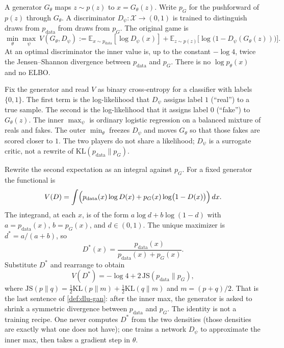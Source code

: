 \begin{definition}
\label{def:dlu-gan}
A generator \(G_\theta\) maps \(z\sim p(z)\) to \(x=G_\theta(z)\). Write \(p_G\) for the pushforward of \(p(z)\) through \(G_\theta\). A discriminator \(D_\psi:\mathcal{X}\to(0,1)\) is trained to distinguish draws from \(p_{\mathrm{data}}\) from draws from \(p_G\). The original game is
\[
\min_\theta\max_\psi\
V(G_\theta,D_\psi)
:=
\mathbb{E}_{x\sim p_{\mathrm{data}}}[\log D_\psi(x)]
+
\mathbb{E}_{z\sim p(z)}\bigl[\log\bigl(1-D_\psi(G_\theta(z))\bigr)\bigr].
\]
At an optimal discriminator the inner value is, up to the constant \(-\log 4\), twice the Jensen--Shannon divergence between \(p_{\mathrm{data}}\) and \(p_G\). There is no \(\log p_\theta(x)\) and no ELBO.
\end{definition}

\begin{note}
\label{note:dlu-gan-read}
Fix the generator and read \(V\) as binary cross-entropy for a classifier with labels \(\{0,1\}\). The first term is the log-likelihood that \(D_\psi\) assigns label \(1\) (``real'') to a true sample. The second is the log-likelihood that it assigns label \(0\) (``fake'') to \(G_\theta(z)\). The inner \(\max_\psi\) is ordinary logistic regression on a balanced mixture of reals and fakes. The outer \(\min_\theta\) freezes \(D_\psi\) and moves \(G_\theta\) so that those fakes are scored closer to \(1\). The two players do not share a likelihood; \(D_\psi\) is a surrogate critic, not a rewrite of \(\mathrm{KL}(p_{\mathrm{data}}\|p_G)\).
\end{note}

\begin{note}
\label{note:dlu-gan-js}
Rewrite the second expectation as an integral against \(p_G\). For a fixed generator the functional is
\[
V(D)
=
\int\Bigl(p_{\mathrm{data}}(x)\log D(x)+p_G(x)\log\bigl(1-D(x)\bigr)\Bigr)\,dx.
\]
The integrand, at each \(x\), is of the form \(a\log d+b\log(1-d)\) with \(a=p_{\mathrm{data}}(x)\), \(b=p_G(x)\), and \(d\in(0,1)\). The unique maximizer is \(d^*=a/(a+b)\), so
\[
D^*(x)
=
\frac{p_{\mathrm{data}}(x)}{p_{\mathrm{data}}(x)+p_G(x)}.
\]
Substitute \(D^*\) and rearrange to obtain
\[
V(D^*)
=
-\log 4
+
2\,\mathrm{JS}(p_{\mathrm{data}}\|p_G),
\]
where \(\mathrm{JS}(p\|q)=\frac12\mathrm{KL}(p\|m)+\frac12\mathrm{KL}(q\|m)\) and \(m=(p+q)/2\). That is the last sentence of \cref{def:dlu-gan}: after the inner max, the generator is asked to shrink a symmetric divergence between \(p_{\mathrm{data}}\) and \(p_G\). The identity is not a training recipe. One never computes \(D^*\) from the two densities (those densities are exactly what one does not have); one trains a network \(D_\psi\) to approximate the inner max, then takes a gradient step in \(\theta\).
\end{note}

